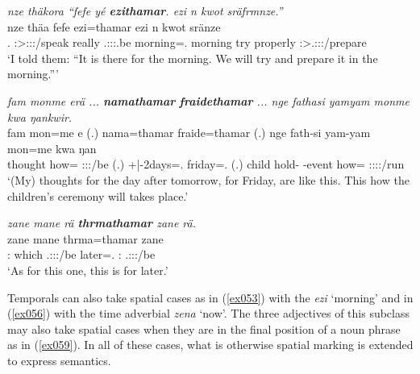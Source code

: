 \begin{exe}
	\ex \emph{nze thäkora ``fefe yé \textbf{ezithamar}. ezi n kwot sräfrmnze.''}\\
	\gll nze thäa fefe  ezi=thamar ezi n kwot sränze\\
	\Fsg.\Erg{} \Fsg:\Sbj>\Stpl:\Obj:\Pst:\Pfv/speak really \Tsg.\Masc:\Sbj:\Nonpast:\Ipfv.be morning=\Temp.\Purp{} morning try properly \Fpl:\Sbj>\Tsg.\Masc:\Obj:\Irr:\Ipfv/prepare\\
	\trans `I told them: ``It is there for the morning. We will try and prepare it in the morning.'''
	\label{ex057}
\end{exe}
\begin{exe}
	\ex \emph{fam monme erä ... \textbf{namathamar} \textbf{fraidethamar} ... nge fathasi yamyam monme kwa ŋankwir.}\\
	\gll fam mon=me e (.) nama=thamar fraide=thamar (.) nge fath-si yam-yam mon=me kwa ŋan\\
	thought how=\Ins{} \Stpl:\Sbj:\Nonpast:\Ipfv/be (.) +|-2days=\Temp.\Purp{} friday=\Temp.\Purp{} (.) child hold-\Nmlz{} \Redup{}-event how=\Ins{} \Fut{} \Stsg:\Sbj:\Nonpast:\Ipfv:\Venit/run\\
	\trans `(My) thoughts for the day after tomorrow, for Friday, are like this. This how the children's ceremony will takes place.'
	\label{ex055}
\end{exe}
\begin{exe}
	\ex \emph{zane mane rä \textbf{thrmathamar} zane rä.}\\
	\gll zane mane  thrma=thamar zane \\
	\Dem:\Prox{} which \Tsg.\F:\Sbj:\Nonpast:\Ipfv/be later=\Temp.\Purp{} \Dem:\Prox{} \Tsg.\F:\Sbj:\Nonpast:\Ipfv/be\\
	\trans `As for this one, this is for later.'
	\label{ex058}
\end{exe}

Temporals can also take spatial cases as in (\ref{ex053}) with the   \emph{ezi} `morning' and in (\ref{ex056}) with the time adverbial \emph{zena} `now'. The three adjectives of this subclass may also take spatial cases when they are in the final position of a noun phrase as in (\ref{ex059}). In all of these cases, what is otherwise spatial marking is extended to express  semantics.

